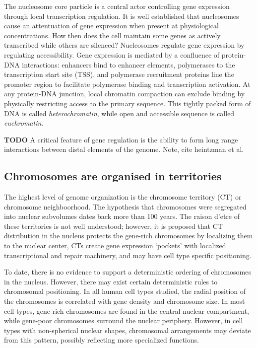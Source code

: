 \documentclass[phd,tocprelim]{cornell}
\begin{document}
The nucleosome core particle is a central actor controlling gene expression
through local transcription regulation.  It is well established that nucleosomes
cause an attentuation of gene expression when present at physiological
concentrations\cite{brown1984}\cite{lorch1987}\cite{laybourn1991}\cite{juan1994}.
How then does the cell maintain some genes as actively transcribed while others
are silenced?  Nucleosomes regulate gene expression by regulating accessibility.
Gene expression is mediated by a confluence of protein-DNA interactions:
enhancers bind to enhancer elements, polymerases to the transcription start
site (TSS), and polymerase recruitment proteins line the promoter region to
facilitate polymerase binding and transcription activation\cite{cox2008}.  At
any protein-DNA junction, local chromatin compaction can exclude binding by
physically restricting access to the primary sequence.  This tightly packed
form of DNA is called \textit{heterochromatin}, while open and accessible
sequence is called \textit{euchromatin}.

\textbf{TODO}
A critical feature of gene regulation is the ability to form long range
interactions between distal elements of the genome.  Note, cite heintzman et al.

\subsection{Chromosomes are organised in territories}

The highest level of genome organization is the chromosome territory (CT) or chromosome neighboorhood\cite{cremer2001}.
The hypothesis that chromosomes were segregated into nuclear subvolumes dates back more than 100
years\cite{cremer1993}.  The raison d'etre of these territories is not well understood; however, it is
proposed that CT distribution in the nucleus protects the gene-rich chromosomes by localizing them to
the nuclear center\cite{boyle2001}\cite{federico2006}, CTs create gene expression `pockets' with localized
transcriptional and repair machinery\cite{bolzer2005}, and may have cell type specific positioning.


To date, there is no evidence to support a deterministic ordering of chromosomes in the nucleus.  However,
there may exist certain deterministic rules to chromosomal positioning.  In all human cell types studied,
the radial position of the chromosomes is correlated with gene density and chromosome size\cite{sun2000}\cite{bolzer2005}.
In most cell types, gene-rich chromosomes are found in the central nuclear compartment, while gene-poor
chromosomes surround the nuclear periphery\cite{boyle2001}\cite{kozubek2005}.  However, in cell types with
non-spherical nuclear shapes, chromosomal arrangements may deviate from this pattern, possibly reflecting
more specialized functions\cite{bolzer2005}.
\end{document}
